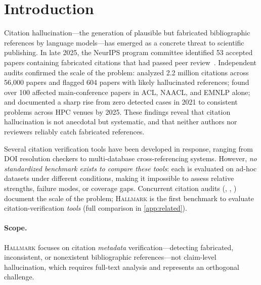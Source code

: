\section{Introduction}
\label{sec:introduction}

Citation hallucination---the generation of plausible but fabricated bibliographic references by language models---has emerged as a concrete threat to scientific publishing.
In late 2025, the NeurIPS program committee identified 53 accepted papers containing fabricated citations that had passed peer review~\citep{neurips2025incident}.
Independent audits confirmed the scale of the problem: \citet{ghostcite2026} analyzed 2.2 million citations across 56,000 papers and flagged 604 papers with likely hallucinated references; \citet{hallucitation2026} found over 100 affected main-conference papers in ACL, NAACL, and EMNLP alone; and \citet{mysterious2026} documented a sharp rise from zero detected cases in 2021 to consistent problems across HPC venues by 2025.
These findings reveal that citation hallucination is not anecdotal but systematic, and that neither authors nor reviewers reliably catch fabricated references.

Several citation verification tools have been developed in response, ranging from DOI resolution checkers to multi-database cross-referencing systems.
However, \emph{no standardized benchmark exists to compare these tools}: each is evaluated on ad-hoc datasets under different conditions, making it impossible to assess relative strengths, failure modes, or coverage gaps.
Concurrent citation audits (\citet{ghostcite2026}, \citet{hallucitation2026}, \citet{mysterious2026}) document the scale of the problem; \textsc{Hallmark} is the first benchmark to evaluate citation-verification \emph{tools} (full comparison in \cref{app:related}).



\paragraph{Scope.}
\textsc{Hallmark} focuses on citation \emph{metadata} verification---detecting fabricated, inconsistent, or nonexistent bibliographic references---not claim-level hallucination, which requires full-text analysis and represents an orthogonal challenge.

